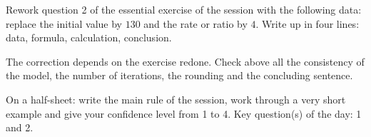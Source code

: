 
\begin{homework}Rework question 2 of the essential exercise of the session with the following data: replace the initial value by $130$ and the rate or ratio by $4$. Write up in four lines: data, formula, calculation, conclusion.\end{homework}
\begin{solution}The correction depends on the exercise redone. Check above all the consistency of the model, the number of iterations, the rounding and the concluding sentence.\end{solution}

\begin{exitticket}[3 minutes]On a half-sheet: write the main rule of the session, work through a very short example and give your confidence level from 1 to 4. Key question(s) of the day: 1 and 2.\end{exitticket}

